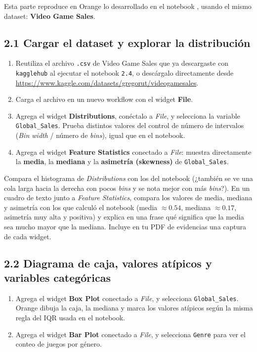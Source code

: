 \documentclass[11pt,letterpaper]{article}
\begin{document}
Esta parte reproduce en Orange lo desarrollado en el notebook \texttt{}, usando el mismo dataset: \textbf{Video Game Sales}.

\subsection{2.1 Cargar el dataset y explorar la distribución}

\begin{enumerate}[leftmargin=1.2cm]
  \item Reutiliza el archivo \texttt{.csv} de Video Game Sales que ya descargaste con \texttt{kagglehub} al ejecutar el notebook \texttt{2.4}, o descárgalo directamente desde \url{https://www.kaggle.com/datasets/gregorut/videogamesales}.
  \item Carga el archivo en un nuevo workflow con el widget \textbf{File}.
  \item Agrega el widget \textbf{Distributions}, conéctalo a \textit{File}, y selecciona la variable \texttt{Global\_Sales}. Prueba distintos valores del control de número de intervalos (\textit{Bin width} / número de \textit{bins}), igual que en el notebook.
  \item Agrega el widget \textbf{Feature Statistics} conectado a \textit{File}: muestra directamente la \textbf{media}, la \textbf{mediana} y la \textbf{asimetría (skewness)} de \texttt{Global\_Sales}.
\end{enumerate}

\begin{actividad}
Compara el histograma de \textit{Distributions} con los del notebook (¿también se ve una cola larga hacia la derecha con pocos \textit{bins} y se nota mejor con más \textit{bins}?). En un cuadro de texto junto a \textit{Feature Statistics}, compara los valores de media, mediana y asimetría con los que calculó el notebook (media $\approx 0.54$, mediana $\approx 0.17$, asimetría muy alta y positiva) y explica en una frase qué significa que la media sea mucho mayor que la mediana. Incluye en tu PDF de evidencias una captura de cada widget.
\end{actividad}

\subsection{2.2 Diagrama de caja, valores atípicos y variables categóricas}

\begin{enumerate}[leftmargin=1.2cm]
  \item Agrega el widget \textbf{Box Plot} conectado a \textit{File}, y selecciona \texttt{Global\_Sales}. Orange dibuja la caja, la mediana y marca los valores atípicos según la misma regla del IQR usada en el notebook.
  \item Agrega el widget \textbf{Bar Plot} conectado a \textit{File}, y selecciona \texttt{Genre} para ver el conteo de juegos por género.
\end{enumerate}
\end{document}
